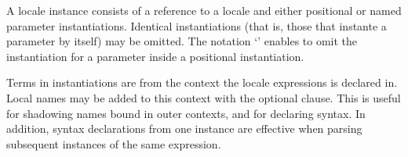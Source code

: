 \begin{isabellebody}
\begin{isamarkuptext}
  A locale instance consists of a reference to a locale and either
  positional or named parameter instantiations.  Identical
  instantiations (that is, those that instante a parameter by itself)
  may be omitted.  The notation `' enables to omit the
  instantiation for a parameter inside a positional instantiation.

  Terms in instantiations are from the context the locale expressions
  is declared in.  Local names may be added to this context with the
  optional \hyperlink{keyword.for}{\mbox{}} clause.  This is useful for shadowing names
  bound in outer contexts, and for declaring syntax.  In addition,
  syntax declarations from one instance are effective when parsing
  subsequent instances of the same expression.


\end{isamarkuptext}
\end{isabellebody}
